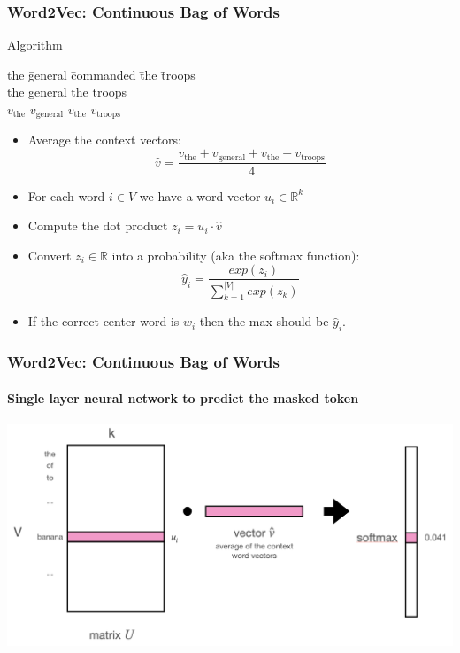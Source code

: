 \begin{frame}
\frametitle{Word2Vec: Continuous Bag of Words}
\begin{block}{Algorithm}
\begin{tabbing}
the \= general \= commanded \= the \= troops\kill \\
the \> general \> \rlap{\underline{\hphantom{commanded}}} \> the \> troops \\
$v_{\textrm{the}}$ \> $v_{\textrm{general}}$ \> \> $v_{\textrm{the}}$ \> $v_{\textrm{troops}}$ 
\end{tabbing}
\begin{itemize}[<+->]
	\item Average the context vectors:
	\[ \hat{v} = \frac{v_{\textrm{the}} + v_{\textrm{general}} + v_{\textrm{the}} + v_{\textrm{troops}}}{4} \]
	\item For each word $i \in V$ we have a word vector $u_i \in \mathbb{R}^k$
	\item Compute the dot product $z_i = u_i \cdot \hat{v}$
	\item Convert $z_i \in \mathbb{R}$ into a probability (aka the softmax function):
	\[ \hat{y}_i = \frac{exp(z_i)}{\sum_{k=1}^{|V|} exp(z_k)} \]
	\item If the correct center word is $w_i$ then the max should be $\hat{y}_i$.
\end{itemize}	
\end{block}
\end{frame}

\begin{frame}
\frametitle{Word2Vec: Continuous Bag of Words}
\framesubtitle{Single layer neural network to predict the masked token}
\includegraphics[scale=.35]{figures/wordvectors/cbowfig}
\end{frame}


